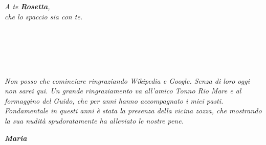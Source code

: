 
\cleardoublepage %

\thispagestyle{empty}%
%
\setlength{\hoffset}{-1in}
\setlength{\voffset}{-1in}

\setlength{\textheight}{211mm}
\setlength{\textwidth}{138mm}

\setlength{\evensidemargin}{32mm}
\setlength{\oddsidemargin}{41mm}
\setlength{\marginparwidth}{0mm}
\setlength{\marginparsep}{0mm}

\setlength{\topmargin}{10mm}
\setlength{\headheight}{5mm}
\setlength{\headsep}{26mm}

\setlength{\footskip}{32mm}

\begin{flushright}
{\itshape A te {\bfseries Rosetta}, \\
che lo spaccio sia con te.}


\end{flushright}

\vspace{6mm}

\noindent
\\\\
\\\\
{\itshape 
Non posso che cominciare ringraziando Wikipedia e Google. Senza di loro oggi non sarei qui. Un grande ringraziamento va all'amico Tonno Rio Mare e al formaggino del Guido,  che per anni hanno accompagnato i miei pasti. Fondamentale in questi anni è stata la presenza della vicina zozza, che mostrando la sua nudità spudoratamente ha alleviato le nostre pene. 

} 
\begin{flushright}
{\itshape \bfseries Maria}
\end{flushright}


\newpage %
\thispagestyle{empty} %
\cleardoublepage %




